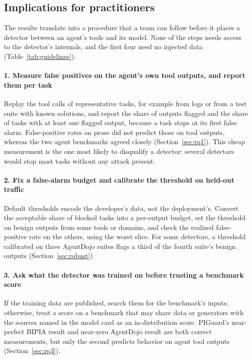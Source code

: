 \subsection{Implications for practitioners}
\label{sec:guidelines}

The results translate into a procedure that a team can follow before it places a detector between an agent's tools and its model. None of the steps needs access to the detector's internals, and the first four need no injected data (Table~\ref{tab:guidelines}).

\paragraph{1. Measure false positives on the agent's own tool outputs, and report them per task}
Replay the tool calls of representative tasks, for example from logs or from a test suite with known solutions, and report the share of outputs flagged and the share of tasks with at least one flagged output, because a task stops at its first false alarm. False-positive rates on prose did not predict those on tool outputs, whereas the two agent benchmarks agreed closely (Section~\ref{sec:rq1}). This cheap measurement is the one most likely to disqualify a detector: several detectors would stop most tasks without any attack present.

\paragraph{2. Fix a false-alarm budget and calibrate the threshold on held-out traffic}
Default thresholds encode the developer's data, not the deployment's. Convert the acceptable share of blocked tasks into a per-output budget, set the threshold on benign outputs from some tools or domains, and check the realized false-positive rate on the others, using the worst slice. For some detectors, a threshold calibrated on three AgentDojo suites flags a third of the fourth suite's benign outputs (Section~\ref{sec:robust}).

\paragraph{3. Ask what the detector was trained on before trusting a benchmark score}
If the training data are published, search them for the benchmark's inputs; otherwise, treat a score on a benchmark that may share data or generators with the sources named in the model card as an in-distribution score. PIGuard's near-perfect BIPIA result and near-zero AgentDojo result are both correct measurements, but only the second predicts behavior on agent tool outputs (Section~\ref{sec:rq3}).

